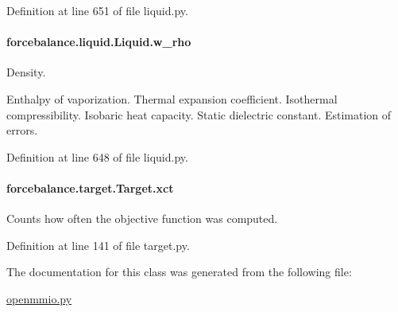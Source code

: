 Definition at line 651 of file liquid.\-py.

\hypertarget{classforcebalance_1_1liquid_1_1Liquid_aef8ad1dda086bde6f48130d273af9784}{
\paragraph[{w\-\_\-rho}]{\setlength{\rightskip}{0pt plus 5cm}forcebalance.\-liquid.\-Liquid.\-w\-\_\-rho\hspace{0.3cm}{\ttfamily [inherited]}}}\label{classforcebalance_1_1liquid_1_1Liquid_aef8ad1dda086bde6f48130d273af9784}


Density. 

Enthalpy of vaporization. Thermal expansion coefficient. Isothermal compressibility. Isobaric heat capacity. Static dielectric constant. Estimation of errors. 

Definition at line 648 of file liquid.\-py.

\hypertarget{classforcebalance_1_1target_1_1Target_aad2e385cfbf7b4a68f1c2cb41133fe82}{
\paragraph[{xct}]{\setlength{\rightskip}{0pt plus 5cm}forcebalance.\-target.\-Target.\-xct\hspace{0.3cm}{\ttfamily [inherited]}}}\label{classforcebalance_1_1target_1_1Target_aad2e385cfbf7b4a68f1c2cb41133fe82}


Counts how often the objective function was computed. 



Definition at line 141 of file target.\-py.



The documentation for this class was generated from the following file\-:\begin{DoxyCompactItemize}
\item 
\hyperlink{openmmio_8py}{openmmio.\-py}\end{DoxyCompactItemize}
